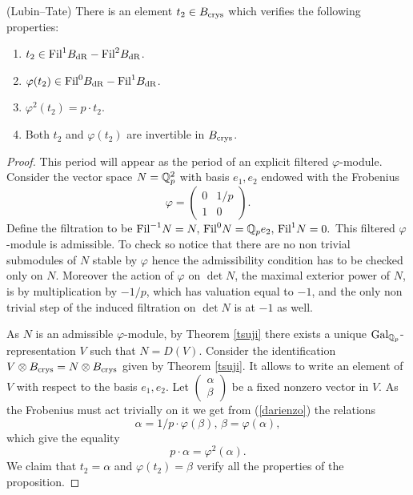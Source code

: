 \documentclass[11pt]{amsart}
\begin{document}
\begin{prop}\label{lubintate} (Lubin--Tate)
There is an element $t_2 \in B_{\textnormal{crys}}$ which verifies the following properties:
\begin{enumerate}
\item $t_2 \in \textnormal{Fil} ^{1} B_{\mathrm{dR}}-\textnormal{Fil} ^{2} B_{\mathrm{dR}}$.
\item  $ \varphi(t_2) \in \textnormal{Fil} ^{0} B_{\mathrm{dR}}-\textnormal{Fil} ^{1} B_{\mathrm{dR}}$.
\item $\varphi^2(t_2) = p \cdot t_2$.
\item Both $t_2 $ and  $ \varphi(t_2) $ are invertible in $B_{\textnormal{crys}}$.
\end{enumerate}
\end{prop}
\begin{proof}
This period will appear as the period of an explicit filtered $\varphi$-module. Consider the vector space  $N=\mathbb{Q}_p^2$ with basis $e_1,e_2$ endowed with the Frobenius
\begin{equation}\label{darienzo}  
\varphi =  \begin{pmatrix} 0 & 1/p \\
1 & 0
 \end{pmatrix}.
 \end{equation}
 Define the filtration to be $\textnormal{Fil}^{-1} N=N, \, \textnormal{Fil}^0 N= \mathbb{Q}_p e_2, \, \textnormal{Fil}^{1} N=0.$ This filtered $\varphi$-module is admissible. To check so notice that there are no non trivial submodules of $N$ stable by $\varphi$ hence the admissibility condition has to be checked only on $N$. 
 Moreover the action of $\varphi$ on $\det N$, the maximal exterior power of $N$, is by multiplication by $-1/p$, which has valuation equal to $-1$, and the only non trivial step of the induced filtration on $\det N$ is at $-1$ as well.
 
 As $N$ is an admissible $\varphi$-module, by Theorem \ref{tsuji} there exists a unique $\textnormal{Gal}_{\mathbb{Q}_p}$-representation $V$ such that $N=D(V)$. 
 Consider the identification $V \otimes B_{\textnormal{crys}}= N \otimes B_{\textnormal{crys}}$ given by  Theorem \ref{tsuji}. It allows to write an element of $V$ with respect to the basis $e_1,e_2$. Let $\begin{pmatrix} \alpha \\
\beta
 \end{pmatrix}$ be a fixed nonzero vector in $V$. As the Frobenius must act trivially on it we get from (\ref{darienzo})  the relations
 \[ \alpha= 1/p \cdot \varphi(\beta),\,
    \beta= \varphi(\alpha),\]
  which give the equality
  \[ p \cdot \alpha=  \varphi^2(\alpha).\]
  We claim that $t_2= \alpha$ and $\varphi(t_2)= \beta$ verify all the properties of the proposition.
  

\end{proof}
\end{document}
